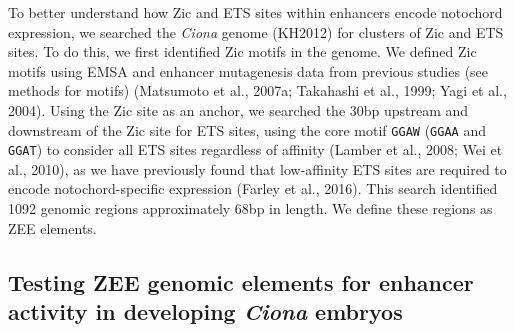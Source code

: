 To better understand how Zic and ETS sites within enhancers encode notochord expression, we searched the \textit{Ciona} genome (KH2012) for clusters of Zic and ETS sites. To do this, we first identified Zic motifs in the genome. We defined Zic motifs using EMSA and enhancer mutagenesis data from previous studies (see methods for motifs) (Matsumoto et al., 2007a; Takahashi et al., 1999; Yagi et al., 2004). Using the Zic site as an anchor, we searched the 30bp upstream and downstream of  the Zic site for ETS sites, using the core motif \verb|GGAW| (\verb|GGAA| and \verb|GGAT|) to consider all ETS sites regardless of affinity (Lamber et al., 2008; Wei et al., 2010), as we have previously found that low-affinity ETS sites are required to encode notochord-specific expression (Farley et al., 2016). This search identified 1092 genomic regions approximately 68bp in length. We define these regions as ZEE elements. 

\subsection{Testing ZEE genomic elements for enhancer activity in developing \textit{Ciona} embryos}

